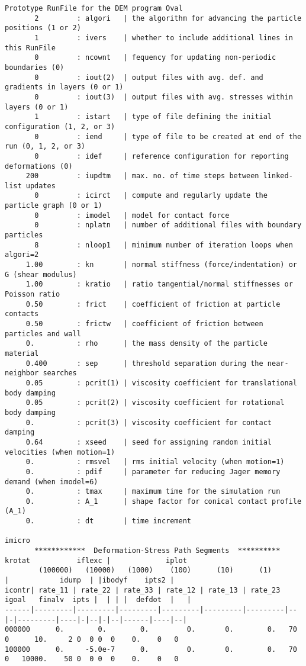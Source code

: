 \begin{verbatim}
Prototype RunFile for the DEM program Oval
       2         : algori   | the algorithm for advancing the particle positions (1 or 2)
       1         : ivers    | whether to include additional lines in this RunFile
       0         : ncownt   | fequency for updating non-periodic boundaries (0)
       0         : iout(2)  | output files with avg. def. and gradients in layers (0 or 1)
       0         : iout(3)  | output files with avg. stresses within layers (0 or 1)
       1         : istart   | type of file defining the initial configuration (1, 2, or 3)
       0         : iend     | type of file to be created at end of the run (0, 1, 2, or 3)
       0         : idef     | reference configuration for reporting deformations (0)
     200         : iupdtm   | max. no. of time steps between linked-list updates
       0         : icirct   | compute and regularly update the particle graph (0 or 1)
       0         : imodel   | model for contact force
       0         : nplatn   | number of additional files with boundary particles
       8         : nloop1   | minimum number of iteration loops when algori=2
     1.00        : kn       | normal stiffness (force/indentation) or G (shear modulus)
     1.00        : kratio   | ratio tangential/normal stiffnesses or Poisson ratio
     0.50        : frict    | coefficient of friction at particle contacts
     0.50        : frictw   | coefficient of friction between particles and wall
     0.          : rho      | the mass density of the particle material
     0.400       : sep      | threshold separation during the near-neighbor searches
     0.05        : pcrit(1) | viscosity coefficient for translational body damping
     0.05        : pcrit(2) | viscosity coefficient for rotational body damping
     0.          : pcrit(3) | viscosity coefficient for contact damping
     0.64        : xseed    | seed for assigning random initial velocities (when motion=1)
     0.          : rmsvel   | rms initial velocity (when motion=1)
     0.          : pdif     | parameter for reducing Jager memory demand (when imodel=6)
     0.          : tmax     | maximum time for the simulation run
     0.          : A_1      | shape factor for conical contact profile (A_1)
     0.          : dt       | time increment
                                                                                         imicro
       ************  Deformation-Stress Path Segments  **********   krotat           iflexc |             iplot
        (100000)   (10000)   (1000)    (100)      (10)      (1)       |            idump  | |ibodyf    ipts2 |
icontr| rate_11 | rate_22 | rate_33 | rate_12 | rate_13 | rate_23 igoal   finalv  ipts |  | | |  defdot  |   |
------|---------|---------|---------|---------|---------|---------|--|-|---------|----|-|--|-|--|------|----|--|
000000      0.        0.        0.         0.       0.        0.   70 0      10.     2 0  0 0  0    0.    0   0
100000      0.     -5.0e-7      0.         0.       0.        0.   70 0   10000.    50 0  0 0  0    0.    0   0
\end{verbatim}
